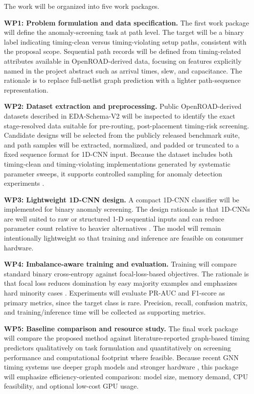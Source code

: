 \documentclass[12pt,a4paper]{article}
\begin{document}
The work will be organized into five work packages.

\textbf{WP1: Problem formulation and data specification.} The first work package will define the anomaly-screening task at path level. The target will be a binary label indicating timing-clean versus timing-violating setup paths, consistent with the proposal scope. Sequential path records will be defined from timing-related attributes available in OpenROAD-derived data, focusing on features explicitly named in the project abstract such as arrival times, slew, and capacitance. The rationale is to replace full-netlist graph prediction with a lighter path-sequence representation.

\textbf{WP2: Dataset extraction and preprocessing.} Public OpenROAD-derived datasets described in EDA-Schema-V2 will be inspected to identify the exact stage-resolved data suitable for pre-routing, post-placement timing-risk screening. Candidate designs will be selected from the publicly released benchmark suite, and path samples will be extracted, normalized, and padded or truncated to a fixed sequence format for 1D-CNN input. Because the dataset includes both timing-clean and timing-violating implementations generated by systematic parameter sweeps, it supports controlled sampling for anomaly detection experiments \cite{Shrestha2026EDA-Schema-V2:}.

\textbf{WP3: Lightweight 1D-CNN design.} A compact 1D-CNN classifier will be implemented for binary anomaly screening. The design rationale is that 1D-CNNs are well suited to raw or structured 1-D sequential inputs and can reduce parameter count relative to heavier alternatives \cite{Gong2022A}. The model will remain intentionally lightweight so that training and inference are feasible on consumer hardware.

\textbf{WP4: Imbalance-aware training and evaluation.} Training will compare standard binary cross-entropy against focal-loss-based objectives. The rationale is that focal loss reduces domination by easy majority examples and emphasizes hard minority cases \cite{Lin2017Focal}. Experiments will evaluate PR-AUC and F1-score as primary metrics, since the target class is rare. Precision, recall, confusion matrix, and training/inference time will be collected as supporting metrics.

\textbf{WP5: Baseline comparison and resource study.} The final work package will compare the proposed method against literature-reported graph-based timing predictors qualitatively on task formulation and quantitatively on screening performance and computational footprint where feasible. Because recent GNN timing systems use deeper graph models and stronger hardware \cite{Ding2024A}, this package will emphasize efficiency-oriented comparison: model size, memory demand, CPU feasibility, and optional low-cost GPU usage.
\end{document}
